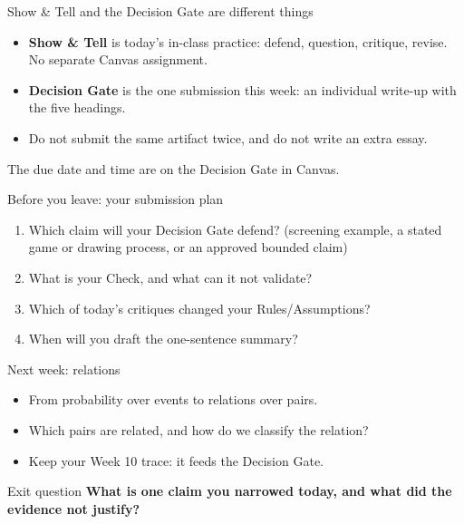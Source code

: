 \documentclass[aspectratio=169,10pt]{beamer}
\begin{document}
\begin{frame}{Show \& Tell and the Decision Gate are different things}
\begin{itemize}
\item \textbf{Show \& Tell} is today's in-class practice: defend, question, critique, revise. No separate Canvas assignment.
\item \textbf{Decision Gate} is the one submission this week: an individual write-up with the five headings.
\item Do not submit the same artifact twice, and do not write an extra essay.
\end{itemize}
\small The due date and time are on the Decision Gate in Canvas.
\end{frame}

\begin{frame}{Before you leave: your submission plan}
\begin{enumerate}
\item Which claim will your Decision Gate defend? (screening example, a stated game or drawing process, or an approved bounded claim)
\item What is your Check, and what can it not validate?
\item Which of today's critiques changed your Rules/Assumptions?
\item When will you draft the one-sentence summary?
\end{enumerate}
\end{frame}

\begin{frame}{Next week: relations}
\begin{itemize}
\item From probability over events to relations over pairs.
\item Which pairs are related, and how do we classify the relation?
\item Keep your Week 10 trace: it feeds the Decision Gate.
\end{itemize}
\end{frame}

\begin{frame}{Exit question}
\Large\centering
\textbf{What is one claim you narrowed today, and what did the evidence not justify?}
\end{frame}
\end{document}
